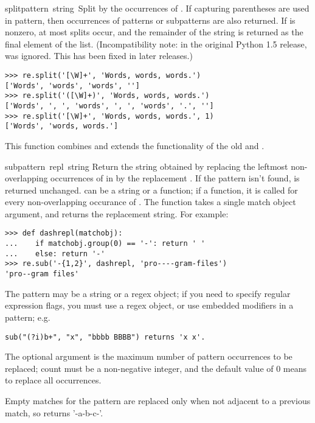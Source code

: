 \begin{funcdesc}{split}{pattern\, string\, }
  Split  by the occurrences of .  If
  capturing parentheses are used in pattern, then occurrences of
  patterns or subpatterns are also returned.
  If  is nonzero, at most  splits
  occur, and the remainder of the string is returned as the final
  element of the list.  (Incompatibility note: in the original Python
  1.5 release,  was ignored.  This has been fixed in
  later releases.)
%
\begin{verbatim}
>>> re.split('[\W]+', 'Words, words, words.')
['Words', 'words', 'words', '']
>>> re.split('([\W]+)', 'Words, words, words.')
['Words', ', ', 'words', ', ', 'words', '.', '']
>>> re.split('[\W]+', 'Words, words, words.', 1)
['Words', 'words, words.']
\end{verbatim}
%
  This function combines and extends the functionality of
  the old  and .
\end{funcdesc}

\begin{funcdesc}{sub}{pattern\, repl\, string}
Return the string obtained by replacing the leftmost non-overlapping
occurrences of  in  by the replacement
.  If the pattern isn't found,  is returned
unchanged.   can be a string or a function; if a function,
it is called for every non-overlapping occurance of .
The function takes a single match object argument, and returns the
replacement string.  For example:
%
\begin{verbatim}
>>> def dashrepl(matchobj):
...    if matchobj.group(0) == '-': return ' '
...    else: return '-'
>>> re.sub('-{1,2}', dashrepl, 'pro----gram-files')
'pro--gram files'
\end{verbatim}
%
The pattern may be a string or a 
regex object; if you need to specify
regular expression flags, you must use a regex object, or use
embedded modifiers in a pattern; e.g.

\begin{verbatim}
sub("(?i)b+", "x", "bbbb BBBB") returns 'x x'.
\end{verbatim}

The optional argument  is the maximum number of pattern
occurrences to be replaced; count must be a non-negative integer, and
the default value of 0 means to replace all occurrences.

Empty matches for the pattern are replaced only when not adjacent to a
previous match, so  returns '-a-b-c-'.
\end{funcdesc}

